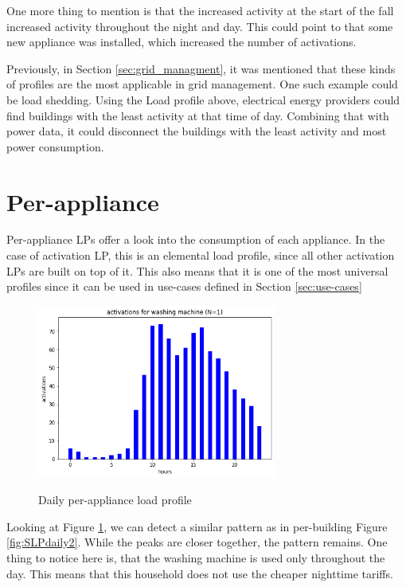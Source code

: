One more thing to mention is that the increased activity at the start of the fall increased activity throughout the night and day.
This could point to that some new appliance was installed, which increased the number of activations.

Previously, in Section \ref{sec:grid_managment}, it was mentioned that these kinds of profiles are the most applicable in grid management. 
One such example could be load shedding.
Using the Load profile above, electrical energy providers could find buildings with the least activity at that time of day.
Combining that with power data, it could disconnect the buildings with the least activity and most power consumption.

\section{Per-appliance}

Per-appliance LPs offer a look into the consumption of each appliance. 
In the case of activation LP, this is an elemental load profile, since all other activation LPs are built on top of it. 
This also means that it is one of the most universal profiles since it can be used in use-cases defined in Section \ref{sec:use-cases}

\begin{figure}[H]
	\centering
	\caption{Daily per-appliance load profile}
	\includegraphics[width=0.7\textwidth]{../Figures/LPS/WM_daily.png}
	\label{fig:WM_daily}
\end{figure}

Looking at Figure \ref{fig:WM_daily}, we can detect a similar pattern as in per-building Figure \ref{fig:SLPdaily2}. 
While the peaks are closer together, the pattern remains.
One thing to notice here is, that the washing machine is used only throughout the day.
This means that this household does not use the cheaper nighttime tariffs.

